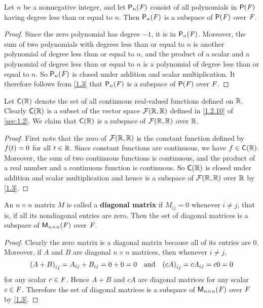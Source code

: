 \begin{eg}\label{1.3.6}
  Let \(n\) be a nonnegative integer, and let \(\ps[n]{\F}\) consist of all polynomials in \(\ps{\F}\) having degree less than or equal to \(n\).
  Then \(\ps[n]{\F}\) is a subspace of \(\ps{\F}\) over \(\mathit{F}\).
\end{eg}

\begin{proof}
  Since the zero polynomial has degree \(-1\), it is in \(\ps[n]{\F}\).
  Moreover, the sum of two polynomials with degrees less than or equal to \(n\) is another polynomial of degree less than or equal to \(n\), and the product of a scalar and a polynomial of degree less than or equal to \(n\) is a polynomial of degree less than or equal to \(n\).
  So \(\ps[n]{\F}\) is closed under addition and scalar multiplication.
  It therefore follows from \cref{1.3} that \(\ps[n]{\F}\) is a subspace of \(\ps{\F}\) over \(\mathit{F}\).
\end{proof}

\begin{eg}\label{1.3.7}
  Let \(\cfs{\R}\) denote the set of all continuous real-valued functions defined on \(\mathbb{R}\).
  Clearly \(\cfs{\R}\) is a subset of the vector space \(\fs{\R}{\R}\) defined in \cref{1.2.10} of \cref{sec:1.2}.
  We claim that \(\cfs{\R}\) is a subspace of \(\fs{\R}{\R}\) over \(\mathbb{R}\).
\end{eg}

\begin{proof}
  First note that the zero of \(\fs{\R}{\R}\) is the constant function defined by \(f\p{t} = 0\) for all \(t \in \mathbb{R}\).
  Since constant functions are continuous, we have \(f \in \cfs{\R}\).
  Moreover, the sum of two continuous functions is continuous, and the product of a real number and a continuous function is continuous.
  So \(\cfs{\R}\) is closed under addition and scalar multiplication and hence is a subspace of \(\fs{\R}{\R}\) over \(\mathbb{R}\) by \cref{1.3}.
\end{proof}

\begin{eg}\label{1.3.8}
  An \(n \times n\) matrix \(M\) is called a \textbf{diagonal matrix} if \(M_{i j} = 0\) whenever \(i \neq j\), that is, if all its nondiagonal entries are zero.
  Then the set of diagonal matrices is a subspace of \(\mathsf{M}_{{n} \times n}({\mathit{F}})\) over \(\mathit{F}\).
\end{eg}

\begin{proof}
  Clearly the zero matrix is a diagonal matrix because all of its entries are \(0\).
  Moreover, if \(A\) and \(B\) are diagonal \(n \times n\) matrices, then whenever \(i \neq j\),
  \[
    \p{A + B}_{i j} = A_{i j} + B_{i j} = 0 + 0 = 0 \quad \text{and} \quad \p{cA}_{i j} = cA_{i j} = c0 = 0
  \]
  for any scalar \(c \in \mathit{F}\).
  Hence \(A + B\) and \(cA\) are diagonal matrices for any scalar \(c \in \mathit{F}\).
  Therefore the set of diagonal matrices is a subspace of \(\mathsf{M}_{{n} \times n}({\mathit{F}})\) over \(\mathit{F}\) by \cref{1.3}.
\end{proof}

